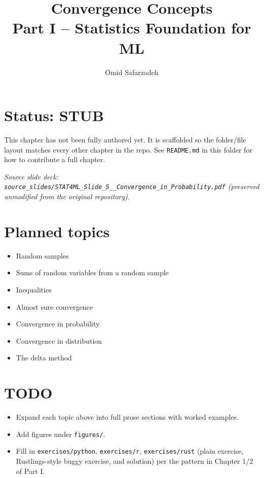 \documentclass[11pt]{article}
\title{Convergence Concepts \\ \large Part I -- Statistics Foundation for ML}
\author{Omid Safarzadeh}
\date{}
\begin{document}
\maketitle

\section*{Status: STUB}
This chapter has not been fully authored yet. It is scaffolded so the
folder/file layout matches every other chapter in the repo. See
\texttt{README.md} in this folder for how to contribute a full chapter.

\textit{Source slide deck: \texttt{source\_slides/STAT4ML\_Slide\_5\_\_Convergence\_in\_Probability.pdf} (preserved unmodified from the original repository).}



\section*{Planned topics}
\begin{itemize}
  \item Random samples
  \item Sums of random variables from a random sample
  \item Inequalities
  \item Almost sure convergence
  \item Convergence in probability
  \item Convergence in distribution
  \item The delta method
\end{itemize}

\section*{TODO}
\begin{itemize}
  \item Expand each topic above into full prose sections with worked examples.
  \item Add figures under \texttt{figures/}.
  \item Fill in \texttt{exercises/python}, \texttt{exercises/r}, \texttt{exercises/rust}
        (plain exercise, Rustlings-style buggy exercise, and solution) per the
        pattern in Chapter 1/2 of Part I.
\end{itemize}
\end{document}
